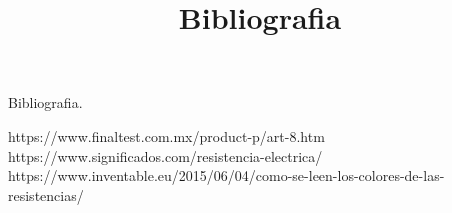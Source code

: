 
\title{Bibliografia}

	\begin{center}
		\begin{huge}
			Bibliografia.\\
			\vspace*{1.5cm}
		\end{huge}
\begin{flushleft}
		https://www.finaltest.com.mx/product-p/art-8.htm\\
	https://www.significados.com/resistencia-electrica/\\
	https://www.inventable.eu/2015/06/04/como-se-leen-los-colores-de-las-resistencias/\\
\end{flushleft}
	\end{center}

	
